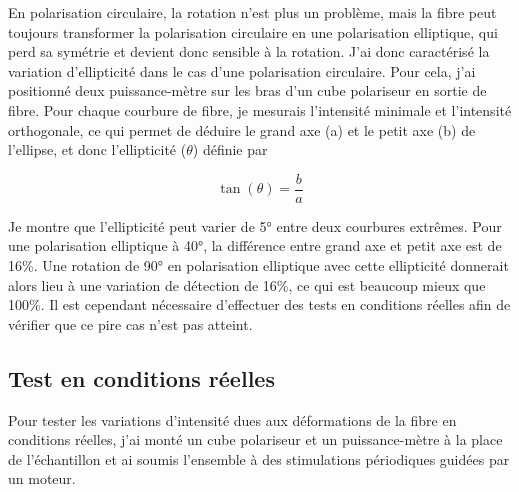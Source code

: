 En polarisation circulaire, la rotation n'est plus un problème, mais la fibre peut toujours transformer la polarisation circulaire en une polarisation elliptique, qui perd sa symétrie et devient donc sensible à la rotation. J'ai donc caractérisé la variation d'ellipticité dans le cas d'une polarisation circulaire. Pour cela, j'ai positionné deux puissance-mètre sur les bras d'un cube polariseur en sortie de fibre. Pour chaque courbure de fibre, je mesurais l'intensité minimale et l'intensité orthogonale, ce qui permet de déduire le grand axe (a) et le petit axe (b) de l'ellipse, et donc l'ellipticité ($\theta$) définie par

$$
\tan(\theta)=\frac{b}{a} 
$$

Je montre que l'ellipticité peut varier de 5° entre deux courbures extrêmes. Pour une polarisation elliptique à 40°, la différence entre grand axe et petit axe est de 16\%. Une rotation de 90° en polarisation elliptique avec cette ellipticité donnerait alors lieu à une variation de détection de 16\%, ce qui est beaucoup mieux que 100\%. Il est cependant nécessaire d'effectuer des tests en conditions réelles afin de vérifier que ce pire cas n'est pas atteint.

\subsection{Test en conditions réelles}

Pour tester les variations d'intensité dues aux déformations de la fibre en conditions réelles, j'ai monté un cube polariseur et un puissance-mètre à la place de l'échantillon et ai soumis l'ensemble à des stimulations périodiques guidées par un moteur.

